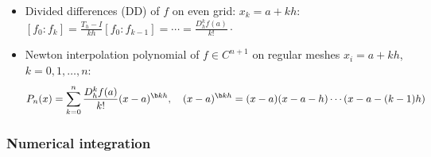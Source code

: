 \documentclass[a4paper]{article}
\begin{document}
\begin{itemize}
  \item Divided differences (DD)
    of $f$ on even grid: $x_k=a+kh$:
    $
    [f_0\!:\!f_k]
    =
     \frac{T_h-I}{kh}[f_0\!:\!f_{k-1}]
     = \cdots
     =\frac{D_h^kf(a)}{k!}
     \cdot
    $

  \item Newton interpolation polynomial
    of $f\in C^{n+1}$ on regular meshes $x_i=a+kh$,
    $k=0,1,\ldots,n$:
    \[
      P_n(x)
      = \sum_{k=0}^n
         \frac{D_h^kf(a)}{k!}
        (x-a)^{\scriptsize\b kh},
        \quad
        (x-a)^{\scriptsize\b kh}
         = (x-a)(x-a-h)\cdots(x-a-(k-1)h)
    \]

\end{itemize}%

\subsubsection*{Numerical integration}%
\end{document}
